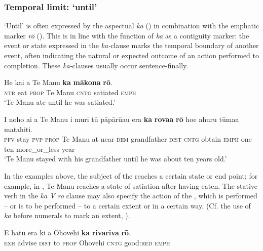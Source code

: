 \subsubsection{Temporal limit: ‘until’}\label{sec:11.6.2.5}

‘Until’ is often expressed by the aspectual \textit{ka} () in combination with the emphatic marker \textit{rō} (). This is in line with the function of \textit{ka} as a contiguity marker: the event or state expressed in the \textit{ka-}clause marks the temporal boundary of another event, often indicating the natural or expected outcome of an action performed to completion. These \textit{ka-}clauses usually occur sentence-finally.

\ea\label{ex:11.237}
\gll He kai a Te Manu \textbf{ka} \textbf{mākona} \textbf{rō}. \\
\textsc{ntr} eat \textsc{prop} Te Manu \textsc{cntg} satiated \textsc{emph} \\

\glt 
‘Te Manu ate until he was satiated.’ \textstyleExampleref{[R245.067]} 
\z

\ea\label{ex:11.238}
\gll I noho ai a Te Manu {\ꞌ}i muri tū pāpārū{\ꞌ}au era \textbf{ka} \textbf{rova{\ꞌ}a} \textbf{rō}  ho{\ꞌ}e {\ꞌ}ahuru tūma{\ꞌ}a matahiti.\\
\textsc{pfv} stay \textsc{pvp} \textsc{prop} Te Manu at near \textsc{dem} grandfather \textsc{dist} \textsc{cntg} obtain \textsc{emph}  one ten more\_or\_less year\\

\glt
‘Te Manu stayed with his grandfather until he was about ten years old.’ \textstyleExampleref{[R245.159]} 
\z

In the examples above, the subject of the  reaches a certain state or end point; for example, in , Te Manu reaches a state of satiation after having eaten. The stative verb in the \textit{ka V rō} clause may also specify the action of the , which is performed – or is to be performed – to a certain extent or in a certain way. (Cf. the use of \textit{ka} before numerals to mark an extent, ).

\ea\label{ex:11.239}
\gll E hatu era ki a {\ꞌ}Ohovehi \textbf{ka} \textbf{rivariva} \textbf{rō}. \\
\textsc{exh} advise \textsc{dist} to \textsc{prop} Ohovehi \textsc{cntg} good:\textsc{red} \textsc{emph} \\

